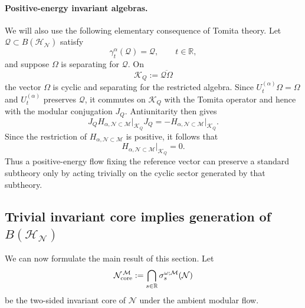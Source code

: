 \documentclass[a4paper,11pt]{article}
\theoremstyle{definition}
\newcommand{\mN}{\mathcal{N}}
\newcommand{\mH}{\mathcal{H}}
\newcommand{\mM}{\mathcal{M}}
\begin{document}
\paragraph{Positive-energy invariant algebras.}
We will also use the following elementary consequence of Tomita theory.
Let $\mathcal Q\subset B(\mH_{\mN})$ satisfy
\begin{equation}
    \gamma_t^\alpha(\mathcal Q)
    =
    \mathcal Q,
    \qquad
    t\in\mathbb R,
    \label{eq:Q-invariant-Halpha}
\end{equation}
and suppose $\Omega$ is separating for $\mathcal Q$. On
\begin{equation}
    \mathcal K_Q
    :=
    \overline{\mathcal Q\Omega}
\end{equation}
the vector $\Omega$ is cyclic and separating for the restricted algebra.
Since $U_t^{(\alpha)}\Omega=\Omega$ and
$U_t^{(\alpha)}$ preserves $\mathcal Q$, it commutes on
$\mathcal K_Q$ with the Tomita operator and hence with the modular
conjugation $J_Q$. Antiunitarity then gives
\begin{equation}
    J_Q
    H_{\alpha,\mN\subset\mM}\big|_{\mathcal K_Q}
    J_Q
    =
    -
    H_{\alpha,\mN\subset\mM}\big|_{\mathcal K_Q}.
\end{equation}
Since the restriction of $H_{\alpha,\mN\subset\mM}$ is positive, it follows that
\begin{equation}
    \boxed{
    H_{\alpha,\mN\subset\mM}\big|_{\mathcal K_Q}=0.
    }
    \label{eq:positive-H-invariant-Q}
\end{equation}
Thus a positive-energy flow fixing the reference vector can preserve a
standard subtheory only by acting trivially on the cyclic sector generated by
that subtheory.

\subsection{Trivial invariant core implies generation of \texorpdfstring{$B(\mH_{\mN})$}{B(HN)}}

We can now formulate the main result of this section. Let
\begin{equation}
    \mN_{\rm core}^{\,\mM}
    :=
    \bigcap_{s\in\mathbb R}
    \sigma_s^{\omega;\mM}(\mN)
    \label{eq:ambient-memory-probing}
\end{equation}
be the two-sided invariant core of $\mN$ under the ambient modular flow.
\end{document}
